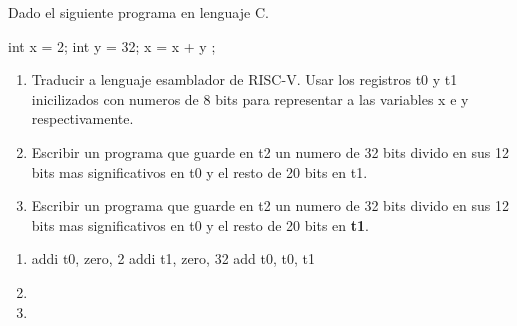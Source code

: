 \begin{enunciado}{\ejercicio}
    Dado el siguiente programa en lenguaje C.

    \begin{center}
    \begin{cLang}[linewidth=6cm]
    int x = 2;
    int y = 32;
    x = x + y ;
    \end{cLang}
\end{center}
    
    \begin{enumerate}
        \item Traducir a lenguaje esamblador de RISC-V. Usar los registros t0 y t1 inicilizados con
numeros de 8 bits para representar a las variables x e y respectivamente.
        \item  Escribir un programa que guarde en t2 un numero de 32 bits divido en sus 12 bits mas
        significativos en t0 y el resto de 20 bits en t1.
        \item Escribir un programa que guarde en t2 un numero de 32 bits divido en sus 12 bits mas
        significativos en t0 y el resto de 20 bits en \textbf{t1}.
    \end{enumerate}
    \end{enunciado}

    \begin{enumerate}
        \item 
        \begin{riscv}
    addi t0, zero, 2
    addi t1, zero, 32
    add t0, t0, t1
        \end{riscv}
        \item \hacer
        \item \hacer
    \end{enumerate}
    